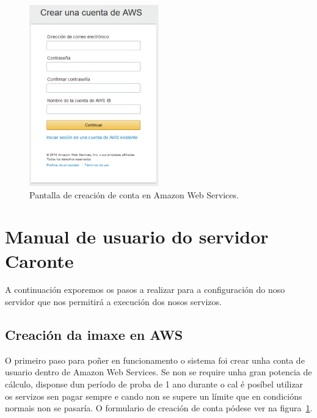 \begin{figure}[H]
	\begin{center}
		\includegraphics[width=0.5\textwidth]{figures/capturas/AWSCrear}
		\caption{Pantalla de creación de conta en Amazon Web Services.}
		\label{fig:AWSCrear}
	\end{center}
\end{figure}

\section{Manual de usuario do servidor Caronte}
A continuación exporemos os pasos a realizar para a configuración do noso servidor que nos permitirá a execución dos nosos servizos.

\subsection{Creación da imaxe en AWS}
O primeiro paso para poñer en funcionamento o sistema foi crear unha conta de usuario dentro de Amazon Web Services. Se non se require unha gran potencia de cálculo, disponse dun período de proba de 1 ano durante o cal é posíbel utilizar os servizos sen pagar sempre e cando non se supere un límite que en condicións normais non se pasaría. O formulario de creación de conta pódese ver na figura~\ref{fig:AWSCrear}.


